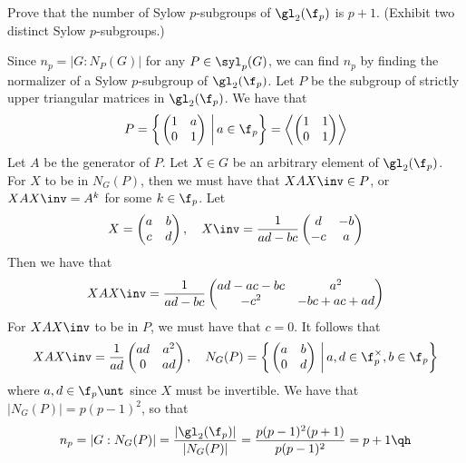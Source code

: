 \begin{exercise}\label{ex4.5.40}
	Prove that the number of Sylow $p$-subgroups of $\gl_2(\f_p)$ is $p + 1$. (Exhibit two distinct Sylow $p$-subgroups.)
\end{exercise}

\begin{sol}
	Since $n_p = |G : N_P(G)|$ for any $P \in \syl_p(G)$, we can find $n_p$ by finding the normalizer of a Sylow $p$-subgroup of $\gl_2(\f_p)$. Let $P$ be the subgroup of strictly upper triangular matrices in $\gl_2(\f_p)$. We have that
	\[P = 
	\left\{\left.
		\begin{pmatrix}
			1 & a \\
			0 & 1
		\end{pmatrix}~\right| a \in \f_p
	\right\}
	= 
	\left\langle
		\begin{pmatrix}
			1 & 1 \\
			0 & 1
		\end{pmatrix}
	\right\rangle
	\]
	Let $A$ be the generator of $P$. Let $X \in G$ be an arbitrary element of $\gl_2(\f_p)$. For $X$ to be in $N_G(P)$, then we must have that $XAX\inv \in P$, or $XAX\inv = A^k$ for some $k \in \f_p$. Let
	\[X =
	\begin{pmatrix}
		a & b \\
		c & d
	\end{pmatrix}, \quad
	X\inv =
	\frac{1}{ad - bc}
	\begin{pmatrix}
		d & -b \\
		-c & a
	\end{pmatrix}
	\]
	Then we have that
	\[XAX\inv =
	\frac{1}{ad - bc}
	\begin{pmatrix}
		ad - ac - bc & a^2 \\
		-c^2 & -bc + ac + ad
	\end{pmatrix}
	\]
	For $XAX\inv$ to be in $P$, we must have that $c = 0$. It follows that
	\[
	XAX\inv = 
	\frac{1}{ad}
	\begin{pmatrix}
		ad & a^2 \\
		0 & ad
	\end{pmatrix}, \quad
	N_G(P) = 
	\left\{\left.
		\begin{pmatrix}
			a & b \\
			0 & d
		\end{pmatrix}~\right| a, d \in \f_p^\times, b \in \f_p
	\right\}
	\]
	where $a, d \in \f_p\unt$ since $X$ must be invertible. We have that $|N_G(P)| = p(p - 1)^2$, so that
	\[n_p = |G : N_G(P)| = \frac{|\gl_2(\f_p)|}{|N_G(P)|} = \frac{p(p - 1)^2(p + 1)}{p(p - 1)^2} = p + 1 \qh\]
\end{sol}

